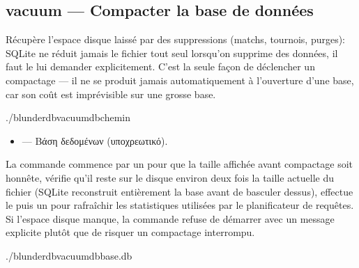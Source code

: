 \documentclass[letterpaper,10pt,greek]{sphinxmanual}
\begin{document}
\subsection{vacuum — Compacter la base de données}
\label{\detokenize{cli:vacuum-compacter-la-base-de-donnees}}
\sphinxAtStartPar
Récupère l’espace disque laissé par des suppressions (matchs, tournois,
purges): SQLite ne réduit jamais le fichier tout seul lorsqu’on supprime des
données, il faut le lui demander explicitement. C’est la seule façon de
déclencher un compactage — il ne se produit jamais automatiquement à
l’ouverture d’une base, car son coût est imprévisible sur une grosse base.

\begin{sphinxVerbatim}[commandchars=\\\{\}]
./blunderdbvacuum\PYGZhy{}\PYGZhy{}db\PYGZlt{}chemin\PYGZgt{}
\end{sphinxVerbatim}

\sphinxAtStartPar
{}
\begin{itemize}
\item {} 
\sphinxAtStartPar
{} — Βάση δεδομένων (υποχρεωτικό).

\end{itemize}

\sphinxAtStartPar
La commande commence par un  pour que la taille
affichée avant compactage soit honnête, vérifie qu’il reste sur le disque
environ deux fois la taille actuelle du fichier (SQLite reconstruit
entièrement la base avant de basculer dessus), effectue le  puis un
 pour rafraîchir les statistiques utilisées par le planificateur de
requêtes. Si l’espace disque manque, la commande refuse de démarrer avec un
message explicite plutôt que de risquer un compactage interrompu.

\sphinxAtStartPar
{}

\begin{sphinxVerbatim}[commandchars=\\\{\}]
./blunderdbvacuum\PYGZhy{}\PYGZhy{}dbbase.db

\end{sphinxVerbatim}
\end{document}
